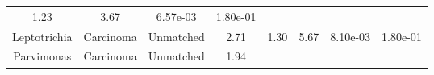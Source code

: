 \documentclass[12pt,]{article}
\begin{document}
\begin{longtable}[]{@{}cccccccc@{}}
\begin{minipage}[t]{0.14\columnwidth}
1.23\strut
\end{minipage} & \begin{minipage}[t]{0.14\columnwidth}\centering\strut
3.67\strut
\end{minipage} & \begin{minipage}[t]{0.06\columnwidth}\centering\strut
6.57e-03\strut
\end{minipage} & \begin{minipage}[t]{0.06\columnwidth}\centering\strut
1.80e-01\strut
\end{minipage}\tabularnewline
\begin{minipage}[t]{0.18\columnwidth}\centering\strut
Leptotrichia\strut
\end{minipage} & \begin{minipage}[t]{0.07\columnwidth}\centering\strut
Carcinoma\strut
\end{minipage} & \begin{minipage}[t]{0.09\columnwidth}\centering\strut
Unmatched\strut
\end{minipage} & \begin{minipage}[t]{0.03\columnwidth}\centering\strut
2.71\strut
\end{minipage} & \begin{minipage}[t]{0.14\columnwidth}\centering\strut
1.30\strut
\end{minipage} & \begin{minipage}[t]{0.14\columnwidth}\centering\strut
5.67\strut
\end{minipage} & \begin{minipage}[t]{0.06\columnwidth}\centering\strut
8.10e-03\strut
\end{minipage} & \begin{minipage}[t]{0.06\columnwidth}\centering\strut
1.80e-01\strut
\end{minipage}\tabularnewline
\begin{minipage}[t]{0.18\columnwidth}\centering\strut
Parvimonas\strut
\end{minipage} & \begin{minipage}[t]{0.07\columnwidth}\centering\strut
Carcinoma\strut
\end{minipage} & \begin{minipage}[t]{0.09\columnwidth}\centering\strut
Unmatched\strut
\end{minipage} & \begin{minipage}[t]{0.03\columnwidth}\centering\strut
1.94\strut
\end{minipage} & \begin{minipage}[t]{0.14\columnwidth}\centering\strut

\end{minipage}
\end{longtable}
\end{document}

